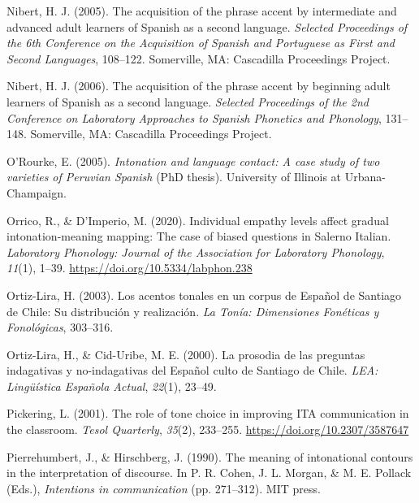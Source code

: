 \documentclass[]{article}
\newlength{\cslhangindent}
\newenvironment{CSLReferences}[2] %
 {%
  \setlength{\parindent}{0pt}
  \ifodd #1 \everypar{\setlength{\hangindent}{\cslhangindent}}\ignorespaces\fi
  \ifnum #2 > 0
  \setlength{\parskip}{#2\baselineskip}
  \fi
 }%
 {}
\begin{document}
\begin{CSLReferences}{1}{0}
\leavevmode{}%
Nibert, H. J. (2005). The acquisition of the phrase accent by intermediate and advanced adult learners of {S}panish as a second language. \emph{{Selected Proceedings of the 6th Conference on the Acquisition of Spanish and Portuguese as First and Second Languages}}, 108--122. Somerville, MA: Cascadilla Proceedings Project.

\leavevmode{}%
Nibert, H. J. (2006). The acquisition of the phrase accent by beginning adult learners of {S}panish as a second language. \emph{{Selected Proceedings of the 2nd Conference on Laboratory Approaches to Spanish Phonetics and Phonology}}, 131--148. Somerville, MA: Cascadilla Proceedings Project.

\leavevmode{}%
O'Rourke, E. (2005). \emph{Intonation and language contact: {A} case study of two varieties of {P}eruvian {S}panish} (PhD thesis). {University of Illinois at Urbana-Champaign}.

\leavevmode{}%
Orrico, R., \& D'Imperio, M. (2020). Individual empathy levels affect gradual intonation-meaning mapping: The case of biased questions in {S}alerno {I}talian. \emph{Laboratory Phonology: Journal of the Association for Laboratory Phonology}, \emph{11}(1), 1--39. \url{https://doi.org/10.5334/labphon.238}

\leavevmode{}%
Ortiz-Lira, H. (2003). Los acentos tonales en un corpus de {E}spañol de {Santiago de Chile}: Su distribución y realización. \emph{La Tonía: Dimensiones Fonéticas y Fonológicas}, 303--316.

\leavevmode{}%
Ortiz-Lira, H., \& Cid-Uribe, M. E. (2000). La prosodia de las preguntas indagativas y no-indagativas del {E}spañol culto de {S}antiago de {C}hile. \emph{LEA: Lingüística {E}spañola {A}ctual}, \emph{22}(1), 23--49.

\leavevmode{}%
Pickering, L. (2001). The role of tone choice in improving {ITA} communication in the classroom. \emph{Tesol Quarterly}, \emph{35}(2), 233--255. \url{https://doi.org/10.2307/3587647}

\leavevmode{}%
Pierrehumbert, J., \& Hirschberg, J. (1990). The meaning of intonational contours in the interpretation of discourse. In P. R. Cohen, J. L. Morgan, \& M. E. Pollack (Eds.), \emph{Intentions in communication} (pp. 271--312). {MIT} press.


\end{CSLReferences}
\end{document}
